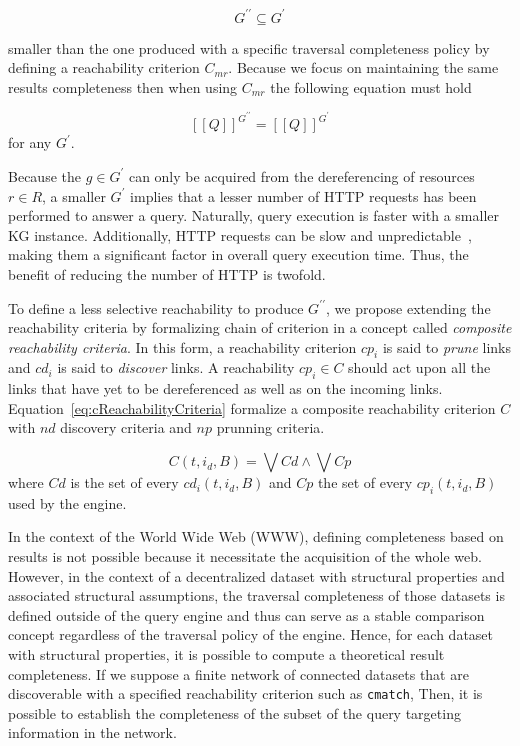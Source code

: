 \begin{equation}\label{eq:subsetDKG}
   G^{\prime\prime} \subseteq G^{\prime}
\end{equation}

smaller than the one produced with a specific traversal completeness policy
by defining a reachability criterion $C_{mr}$.
Because we focus on maintaining the same results completeness then when using $C_{mr}$ the following equation must hold

\begin{equation}\label{eq:evalQueryStructuralAssumption}
   [\![ Q ]\!]^{G^{\prime\prime}} = [\![ Q ]\!]^{G^{\prime}}
\end{equation}
for any $G^{\prime}$.

Because the $g \in G^{\prime}$ can only be acquired from the dereferencing of resources $r \in R$, a smaller $G^\prime$ implies that a lesser number of HTTP requests has been performed to answer a query.
Naturally, query execution is faster with a smaller KG instance.
Additionally, HTTP requests can be slow and unpredictable~\cite{hartig2016walking}, making them a significant factor in overall query execution time. 
Thus, the benefit of reducing the number of HTTP is twofold.

To define a less selective reachability to produce $G^{\prime\prime}$, we propose extending the reachability criteria by formalizing chain of criterion in a concept called \emph{composite reachability criteria}.
In this form, a reachability criterion $cp_i$ is said to \emph{prune} links and $cd_i$ is said to \emph{discover} links.
A reachability $cp_i \in C$ should act upon all the links that have yet to be dereferenced as well as on the incoming links.
Equation~\ref{eq:cReachabilityCriteria} formalize a composite reachability criterion $C$ with $nd$ discovery criteria and $np$ prunning criteria.

\begin{equation}\label{eq:cReachabilityCriteria}
    C(t, i_d, B)  = \bigvee Cd \land \bigvee Cp
\end{equation}
where $Cd$ is the set of every $cd_i(t, i_d, B)$ and $Cp$ the set of every $cp_i(t, i_d, B)$ used by the engine.
\iffalse
Maybe refer to the link queue here in a footnote.
\fi

\iffalse
In the context of the World Wide Web (WWW), defining completeness based on results is not possible because it necessitate the acquisition of the whole web.
However, in the context of a decentralized dataset with structural properties and associated structural assumptions,
the traversal completeness of those datasets is defined outside of the query engine and thus can serve as a 
stable comparison concept regardless of the traversal policy of the engine.
Hence, for each dataset with structural properties, it is possible to compute a theoretical result completeness.
If we suppose a finite network of connected datasets that are discoverable with a specified reachability criterion such as \texttt{cmatch},
Then, it is possible to establish the completeness of the subset of the query targeting information in the network.



